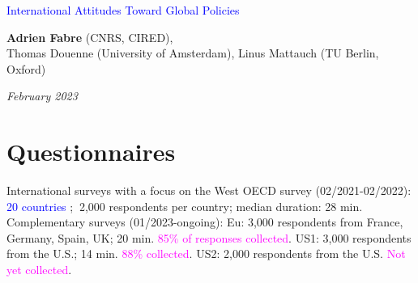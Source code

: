 
\usepackage{multicol}
              


\begin{frame}
\thispagestyle{empty}
\begin{center}
\begin{LARGE}
\textcolor{blue}{International Attitudes Toward Global Policies}
\end{LARGE}

\vspace{1cm}
\textbf{Adrien Fabre} (CNRS, CIRED),\\ Thomas Douenne (University of Amsterdam), Linus Mattauch (TU Berlin, Oxford)

\medskip
{}
\textit{February 2023} 

\end{center}

\bigskip

\end{frame}

\section{Questionnaires}

\begin{frame}{International surveys with a focus on the West\label{questionnaires}}
    \bbvs
    \ip OECD survey (02/2021-02/2022): 
    \bbvs \ip \textcolor{blue}{20 countries}%
    ; $~$2,000 respondents per country; median duration: 28 min. \ee
    \ip Complementary surveys (01/2023-ongoing): 
    \bbvs \ip Eu: 3,000 respondents from France, Germany, Spain, UK; 20 min. \textcolor{magenta}{85\% of responses collected}.
    \ip US1: 3,000 respondents from the U.S.; 14 min. \textcolor{magenta}{88\% collected}.
    \ip US2: 2,000 respondents from the U.S. \textcolor{magenta}{Not yet collected}.
    \ee 
    \ee
\end{frame}

